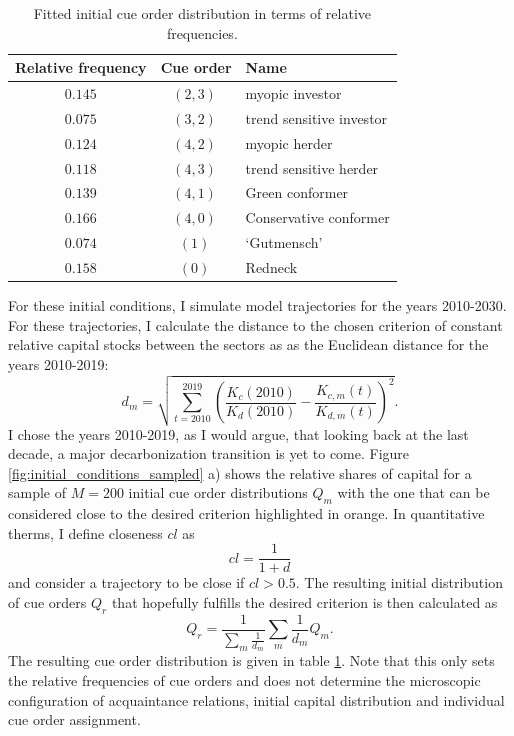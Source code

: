 \begin{table}[t]
    \centering
    \begin{tabular}{c|c|l}
        Relative frequency & Cue order & Name \\ \hline
        $0.145$&$(2, 3)~$&myopic investor\\
    $0.075$& $(3, 2)~$& trend sensitive investor\\
        $0.124$& $(4, 2)~$& myopic herder\\
        $0.118$& $(4, 3)~$& trend sensitive herder\\
        $0.139$& $(4, 1)~$& Green conformer\\
        $0.166$& $(4, 0)~$& Conservative conformer\\
        $0.074$& $(1)~$& `Gutmensch'\\
        $0.158$& $(0)~$& Redneck

    \end{tabular}
    \caption{Fitted initial cue order distribution in terms of relative frequencies.}
    \label{tab:initial_cue_order_dist}
\end{table}

For these initial conditions, I simulate model trajectories for the years 2010-2030. For these trajectories, I calculate the distance to the chosen criterion of constant relative capital stocks between the sectors as as the Euclidean distance for the years 2010-2019:
\begin{equation}
  d_m = \sqrt{\sum_{t=2010}^{2019}\left( \frac{K_c(2010)}{K_d(2010)} - \frac{K_{c,m}(t)}{K_{d,m}(t)} \right)^{2}}.
  \label{eq:distance_criterion}
\end{equation}
I chose the years 2010-2019, as I would argue, that looking back at the last decade, a major decarbonization transition is yet to come.
Figure \ref{fig:initial_conditions_sampled} a) shows the relative shares of capital for a sample of $M=200$ initial cue order distributions $Q_m$ with the one that can be considered close to the desired criterion highlighted in orange. In quantitative therms, I define closeness $cl$ as
\begin{equation}
  cl = \frac{1}{1+d}
  \label{eq:closeness}
\end{equation}
and consider a trajectory to be close if $cl > 0.5$.
The resulting initial distribution of cue orders $Q_r$ that hopefully fulfills the desired criterion is then calculated as
\begin{equation}
    Q_r = \frac{1}{\sum_m \frac{1}{d_m}}\sum_{m}\frac{1}{d_m} Q_m.
  \label{eq:updated_cue_order_distribution}
\end{equation}
The resulting cue order distribution is given in table \ref{tab:initial_cue_order_dist}.
Note that this only sets the relative frequencies of cue orders and does not determine the microscopic configuration of acquaintance relations, initial capital distribution and individual cue order assignment.

